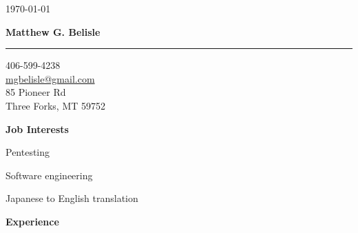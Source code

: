 \documentclass[10pt, a4paper]{article}
\begin{document}
\thispagestyle{empty}
\begin{flushright}
\small \today
\end{flushright}
\begin{center}
\textbf{\Large Matthew G. Belisle}
\rule{\linewidth}{0.5mm}
\end{center}
\begin{flushright}
\begin{minipage}[h]{0.25\linewidth}\small
\begin{flushleft}
406-599-4238\\
\href{mailto:mgbelisle@gmail.com}{mgbelisle@gmail.com}\\
85 Pioneer Rd\\
Three Forks, MT 59752
\end{flushleft}
\end{minipage}
\end{flushright}
\textbf{Job Interests}
\begin{itemize*}
  \item Pentesting
  \item Software engineering
  \item Japanese to English translation
\end{itemize*}
\textbf{Experience}
\end{document}
